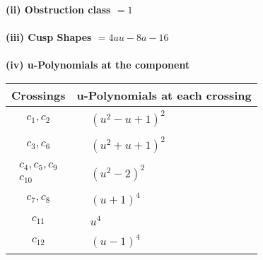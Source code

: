 \documentclass[1p]{elsarticle_modified}
\theoremstyle{definition}
\begin{document}
\flushleft \textbf{(ii) Obstruction class $= 1$}\\~\\
\flushleft \textbf{(iii) Cusp Shapes $= 4 a u-8 a-16$}\\~\\
\newpage\renewcommand{\arraystretch}{1}
\flushleft \textbf{(iv) u-Polynomials at the component}\newline \\
\begin{tabular}{m{50pt}|m{274pt}}
Crossings & \hspace{64pt}u-Polynomials at each crossing \\
\hline $$\begin{aligned}c_{1},c_{2}\end{aligned}$$&$\begin{aligned}
&(u^2- u+1)^2
\end{aligned}$\\
\hline $$\begin{aligned}c_{3},c_{6}\end{aligned}$$&$\begin{aligned}
&(u^2+u+1)^2
\end{aligned}$\\
\hline $$\begin{aligned}c_{4},c_{5},c_{9}\\c_{10}\end{aligned}$$&$\begin{aligned}
&(u^2-2)^2
\end{aligned}$\\
\hline $$\begin{aligned}c_{7},c_{8}\end{aligned}$$&$\begin{aligned}
&(u+1)^4
\end{aligned}$\\
\hline $$\begin{aligned}c_{11}\end{aligned}$$&$\begin{aligned}
&u^4
\end{aligned}$\\
\hline $$\begin{aligned}c_{12}\end{aligned}$$&$\begin{aligned}
&(u-1)^4
\end{aligned}$\\
\hline
\end{tabular}\\~\\
\end{document}
